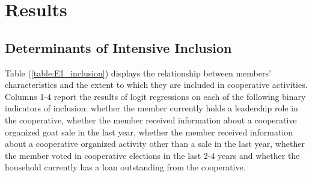 \documentclass[11pt]{article}
\begin{document}
\section{Results}

\subsection{Determinants of Intensive Inclusion}

Table (\ref{table:E1_inclusion}) displays the relationship between members' characteristics and the extent to which they are included in cooperative activities. Columns 1-4 report the results of logit regressions on each of the following binary indicators of inclusion: whether the member currently holds a leadership role in the cooperative, whether the member received information about a cooperative organized goat sale in the last year, whether the member received information about a cooperative organized activity other than a sale in the last year, whether the member voted in cooperative elections in the last 2-4 years and whether the household currently has a loan outstanding from the cooperative. 
\end{document}
